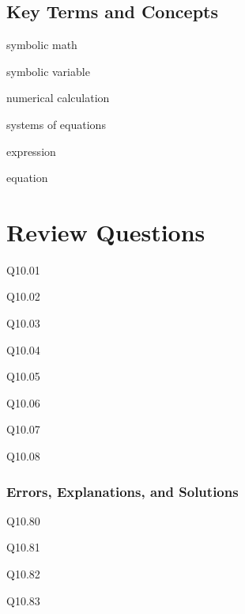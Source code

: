 \documentclass{book}
\newenvironment{problems}{}{}  %
\newenvironment{key_terms}{\begin{multicols}{3}}{\end{multicols}} %
\begin{document}
    




    
        \subsection{Key Terms and Concepts}\label{key-terms-and-concepts}
    




    
        \begin{key_terms}
        symbolic math

symbolic variable

numerical calculation

systems of equations

expression

equation
        \end{key_terms}

    




    
        \section{Review Questions}\label{review-questions}
    




    
        \begin{problems}
        Q10.01

Q10.02

Q10.03

Q10.04

Q10.05

Q10.06

Q10.07

Q10.08
        \end{problems}

    




    
        \subsubsection{Errors, Explanations, and
Solutions}\label{errors-explanations-and-solutions}

Q10.80

Q10.81

Q10.82

Q10.83
\end{document}
